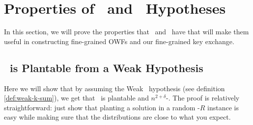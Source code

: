 \section{Properties of \kSum~and \zkclique~Hypotheses}
\label{sec:kcliqueksumAllTHeThings}
In this section, we will prove the properties that \kSum~and \zkclique~have that will make them useful in constructing fine-grained OWFs and our fine-grained key exchange.

\subsection{\kSum~is Plantable from a Weak Hypothesis}
Here we will show that by assuming the Weak \kSum~hypothesis (see definition \ref{def:weak-k-sum}), we get that \kSum~is plantable and $n^{2+\delta}$-\ACIH. The proof is relatively straightforward: just show that planting a solution in a random \kSum-$R$ instance is easy while making sure that the distributions are close to what you expect.


